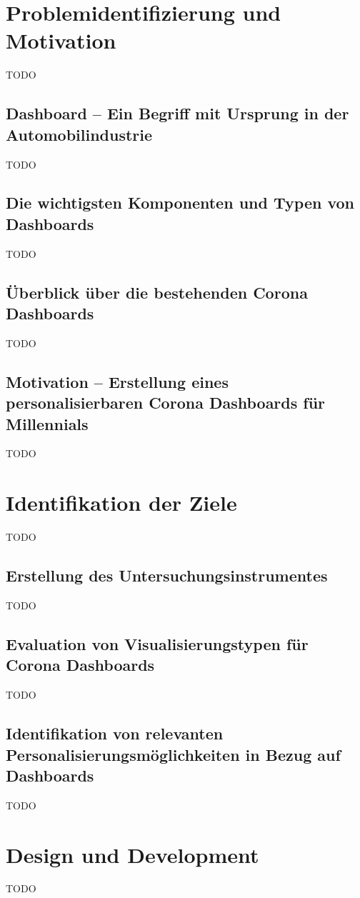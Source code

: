 \documentclass[12pt, oneside]{article}
\begin{document}
\clearpage
\section{Problemidentifizierung und Motivation}
TODO

\subsection{Dashboard – Ein Begriff mit Ursprung in der Automobilindustrie}
TODO

\subsection{Die wichtigsten Komponenten und Typen von Dashboards}
TODO

\subsection{Überblick über die bestehenden Corona Dashboards}
TODO

\subsection{Motivation – Erstellung eines personalisierbaren Corona Dashboards für Millennials}
TODO

\clearpage
\section{Identifikation der Ziele}
TODO

\subsection{Erstellung des Untersuchungsinstrumentes}
TODO

\subsection{Evaluation von Visualisierungstypen für Corona Dashboards}
TODO

\subsection{Identifikation von relevanten Personalisierungsmöglichkeiten in Bezug auf Dashboards}
TODO

\clearpage
\section{Design und Development}
TODO
\end{document}
